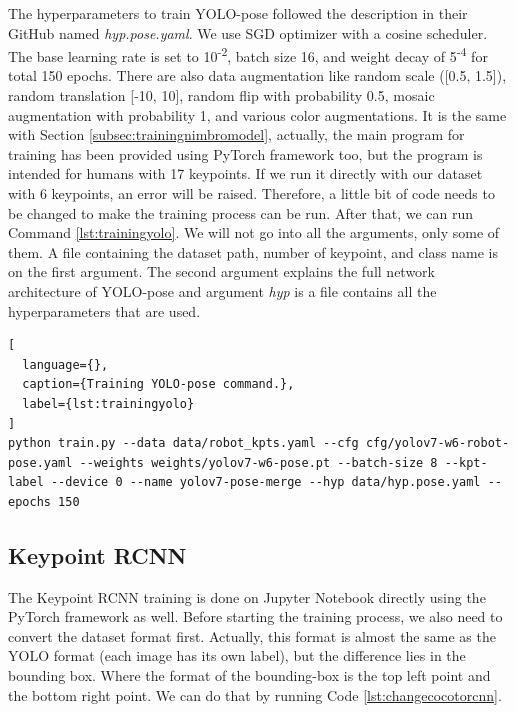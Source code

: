 The hyperparameters to train YOLO-pose followed the description in their GitHub named \emph{hyp.pose.yaml}.
We use SGD optimizer with a cosine scheduler. The base learning rate is set to 10\textsuperscript{-2}, batch size 16,
and weight decay of 5\textsuperscript{-4} for total 150 epochs. There are also data augmentation like random scale ([0.5, 1.5]),
random translation [-10, 10], random flip with probability 0.5, mosaic augmentation with probability 1, and various color augmentations.
It is the same with Section \ref{subsec:trainingnimbromodel}, actually, the main program for training has been provided using PyTorch framework too, but the program is intended for humans with 17 keypoints.
If we run it directly with our dataset with 6 keypoints, an error will be raised. Therefore, a little bit of code needs to be changed to make the training process can be run.
After that, we can run Command \ref{lst:trainingyolo}. We will not go into all the arguments, only some of them. 
A file containing the dataset path, number of keypoint, and class name is on the first argument. The second argument explains the full network architecture of YOLO-pose and 
argument \emph{hyp} is a file contains all the hyperparameters that are used.

\begin{lstlisting}[
  language={},
  caption={Training YOLO-pose command.},
  label={lst:trainingyolo}
]
python train.py --data data/robot_kpts.yaml --cfg cfg/yolov7-w6-robot-pose.yaml --weights weights/yolov7-w6-pose.pt --batch-size 8 --kpt-label --device 0 --name yolov7-pose-merge --hyp data/hyp.pose.yaml --epochs 150
\end{lstlisting}

\subsection{Keypoint RCNN}
\label{subsec:trainingrcnn}

The Keypoint RCNN training is done on Jupyter Notebook directly using the PyTorch framework as well.
Before starting the training process, we also need to convert the dataset format first.
Actually, this format is almost the same as the YOLO format (each image has its own label), but the difference lies in the bounding box.
Where the format of the bounding-box is the top left point and the bottom right point. We can do that by running Code \ref{lst:changecocotorcnn}.



